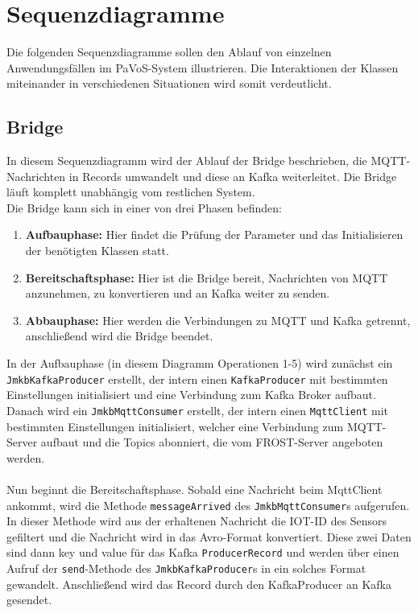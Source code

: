 \chapter{Sequenzdiagramme}
Die folgenden Sequenzdiagramme sollen den Ablauf von einzelnen Anwendungsfällen im PaVoS-System illustrieren. Die Interaktionen der Klassen miteinander in verschiedenen Situationen wird somit verdeutlicht.

\section{Bridge}
In diesem Sequenzdiagramm wird der Ablauf der Bridge beschrieben, die MQTT-Nachrichten in Records umwandelt und diese an Kafka weiterleitet. Die Bridge läuft komplett unabhängig vom restlichen System.\\
Die Bridge kann sich in einer von drei Phasen befinden:
\begin{enumerate}
	\item \textbf{Aufbauphase:} Hier findet die Prüfung der Parameter und das Initialisieren der benötigten Klassen statt.
	\item \textbf{Bereitschaftsphase:} Hier ist die Bridge bereit, Nachrichten von MQTT anzunehmen, zu konvertieren und an Kafka weiter zu senden.
	\item \textbf{Abbauphase:} Hier werden die Verbindungen zu MQTT und Kafka getrennt, anschließend wird die Bridge beendet.
\end{enumerate}
In der Aufbauphase (in diesem Diagramm Operationen 1-5) wird zunächst ein \texttt{JmkbKafkaProducer} erstellt, der intern einen \texttt{KafkaProducer} mit bestimmten Einstellungen initialisiert und eine Verbindung zum Kafka Broker aufbaut. Danach wird ein \texttt{JmkbMqttConsumer} erstellt, der intern einen \texttt{MqttClient} mit bestimmten Einstellungen initialisiert, welcher eine Verbindung zum MQTT-Server aufbaut und die Topics abonniert, die vom FROST-Server angeboten werden.\\\\
Nun beginnt die Bereitschaftsphase. Sobald eine Nachricht beim MqttClient ankommt, wird die Methode \texttt{messageArrived} des \texttt{JmkbMqttConsumer}s aufgerufen. In dieser Methode wird aus der erhaltenen Nachricht die IOT-ID des Sensors gefiltert und die Nachricht wird in das Avro-Format konvertiert. Diese zwei Daten sind dann key und value für das Kafka \texttt{ProducerRecord} und werden über einen Aufruf der \texttt{send}-Methode des \texttt{JmkbKafkaProducer}s in ein solches Format gewandelt. Anschließend wird das Record durch den KafkaProducer an Kafka gesendet.\\\\
